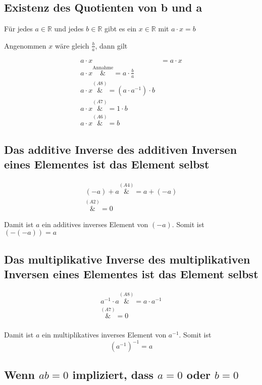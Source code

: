 \documentclass{article}
\begin{document}
\subsection{Existenz des Quotienten von b und a}
Für jedes $a \in \mathbb{R}$ und jedes $b \in \mathbb{R}$ gibt es ein $x \in \mathbb{R}$
mit $a \cdot x = b$

Angenommen $x$ wäre gleich $\frac{b}{a}$, dann gilt

\begin{align*}
  a \cdot x &= a \cdot x \\
  a \cdot x \overset{\text{Annahme}}&= a \cdot \frac{b}{a} \\ 
  a \cdot x \overset{\hyperref[a8]{(A8)}}&= (a \cdot a^{-1}) \cdot b \\ 
  a \cdot x \overset{\hyperref[a7]{(A7)}}&= 1 \cdot b \\
  a \cdot x \overset{\hyperref[a6]{(A6)}}&= b
\end{align*}

\subsection{Das additive Inverse des additiven Inversen eines Elementes ist das Element selbst}

\begin{align*}
  (-a) + a \overset{\hyperref[a4]{(A4)}}&= a + (-a) \\
  \overset{\hyperref[a2]{(A2)}}&= 0
\end{align*}

Damit ist $a$ ein additives inverses Element von $(-a)$.
Somit ist $(-(-a)) = a$

\subsection{Das multiplikative Inverse des multiplikativen Inversen eines Elementes ist das Element selbst}

\begin{align*}
  a^{-1} \cdot a \overset{\hyperref[a8]{(A8)}}&= a \cdot a^{-1} \\
  \overset{\hyperref[a7]{(A7)}}&= 0 \\
\end{align*}

Damit ist $a$ ein multiplikatives inverses Element von $a^{-1}$.
Somit ist
\[
  (a^{-1})^{-1} = a
\]

\subsection{Wenn $ab = 0$ impliziert, dass  $a = 0$ oder $b = 0$}
\end{document}
